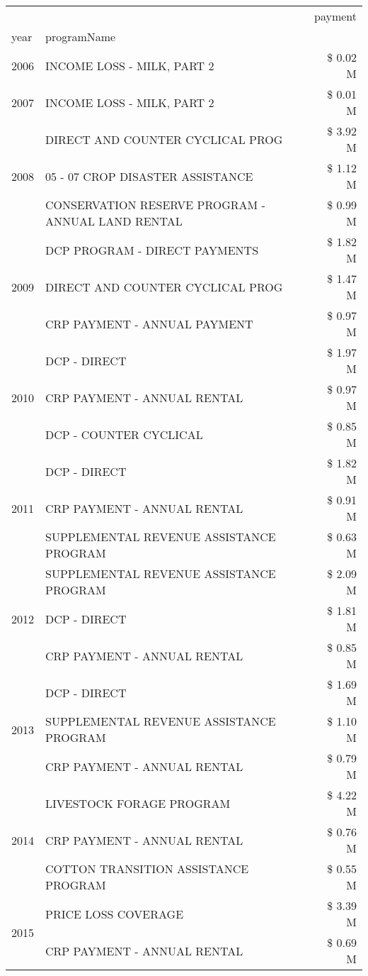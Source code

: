 \begin{tabular}{llr}
\toprule
 &  & payment \\
year & programName &  \\
\midrule
2006 & INCOME LOSS - MILK, PART 2 & \$ 0.02 M \\
\cline{1-3}
2007 & INCOME LOSS - MILK, PART 2 & \$ 0.01 M \\
\cline{1-3}
\multirow[t]{3}{*}{2008} & DIRECT AND COUNTER CYCLICAL PROG & \$ 3.92 M \\
 & 05 - 07 CROP DISASTER ASSISTANCE & \$ 1.12 M \\
 & CONSERVATION RESERVE PROGRAM - ANNUAL LAND RENTAL & \$ 0.99 M \\
\cline{1-3}
\multirow[t]{3}{*}{2009} & DCP PROGRAM - DIRECT PAYMENTS & \$ 1.82 M \\
 & DIRECT AND COUNTER CYCLICAL PROG & \$ 1.47 M \\
 & CRP PAYMENT - ANNUAL PAYMENT & \$ 0.97 M \\
\cline{1-3}
\multirow[t]{3}{*}{2010} & DCP - DIRECT & \$ 1.97 M \\
 & CRP PAYMENT - ANNUAL RENTAL & \$ 0.97 M \\
 & DCP - COUNTER CYCLICAL & \$ 0.85 M \\
\cline{1-3}
\multirow[t]{3}{*}{2011} & DCP - DIRECT & \$ 1.82 M \\
 & CRP PAYMENT - ANNUAL RENTAL & \$ 0.91 M \\
 & SUPPLEMENTAL REVENUE ASSISTANCE PROGRAM & \$ 0.63 M \\
\cline{1-3}
\multirow[t]{3}{*}{2012} & SUPPLEMENTAL REVENUE ASSISTANCE PROGRAM & \$ 2.09 M \\
 & DCP - DIRECT & \$ 1.81 M \\
 & CRP PAYMENT - ANNUAL RENTAL & \$ 0.85 M \\
\cline{1-3}
\multirow[t]{3}{*}{2013} & DCP - DIRECT & \$ 1.69 M \\
 & SUPPLEMENTAL REVENUE ASSISTANCE PROGRAM & \$ 1.10 M \\
 & CRP PAYMENT - ANNUAL RENTAL & \$ 0.79 M \\
\cline{1-3}
\multirow[t]{3}{*}{2014} & LIVESTOCK FORAGE PROGRAM & \$ 4.22 M \\
 & CRP PAYMENT - ANNUAL RENTAL & \$ 0.76 M \\
 & COTTON TRANSITION ASSISTANCE PROGRAM & \$ 0.55 M \\
\cline{1-3}
\multirow[t]{3}{*}{2015} & PRICE LOSS COVERAGE & \$ 3.39 M \\
 & CRP PAYMENT - ANNUAL RENTAL & \$ 0.69 M \\

\end{tabular}
